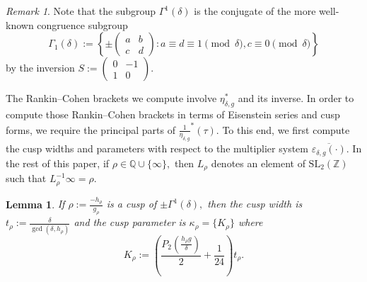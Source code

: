 \documentclass[10pt]{amsart}
\newtheorem{lemma}[theorem]{Lemma}
\theoremstyle{definition}
\theoremstyle{remark}
\newtheorem*{remark}{Remark}
\numberwithin{equation}{section}
\newcommand{\SL}{\mathrm{SL}}
\newcommand{\Q}{\mathbb Q}
\newcommand{\Z}{\mathbb Z}
\begin{document}
	\begin{remark}
		Note that the subgroup $\Gamma^1(\delta)$ is the conjugate of the more well-known congruence subgroup 
		$$
		\Gamma_1(\delta):=\left\{\pm\begin{pmatrix}
			a & b \\
			c & d
		\end{pmatrix}: a\equiv d\equiv 1\pmod\delta, c\equiv 0\pmod\delta\right\}
		$$
		by the inversion $S:=\begin{pmatrix}
			0 & -1 \\
			1 & 0
		\end{pmatrix}.$
	\end{remark}
	
	The Rankin--Cohen brackets we compute involve $\eta_{\delta,g}^\ast$ and its inverse. In order to compute those Rankin--Cohen brackets in terms of Eisenstein series and cusp forms, we require the principal parts of $\frac{1}{\eta_{\delta,g}}^\ast(\tau).$ To this end, we first compute the cusp widths and parameters with respect to the multiplier system $\overline{\varepsilon_{\delta,g}(\cdot)}.$ In the rest of this paper, if $\rho\in\Q\cup\{\infty\},$ then $L_\rho$ denotes an element of $\SL_2(\Z)$ such that $L_\rho^{-1}\infty=\rho.$ 
	
	\begin{lemma}
		If $\rho:=\frac{-h_\rho}{g_\rho}$ is a cusp of $\pm\Gamma^1(\delta),$ then the cusp width is $t_\rho:=\frac{\delta}{\gcd(\delta,h_\rho)}$ and the cusp parameter is $\kappa_\rho=\{K_\rho\}$ where
		$$
		K_\rho:=\left(\frac{P_2\left(\frac{h_\rho g}{\delta}\right)}{2}+\frac{1}{24}\right)t_\rho.
		$$
	\end{lemma}
	
\end{document}
